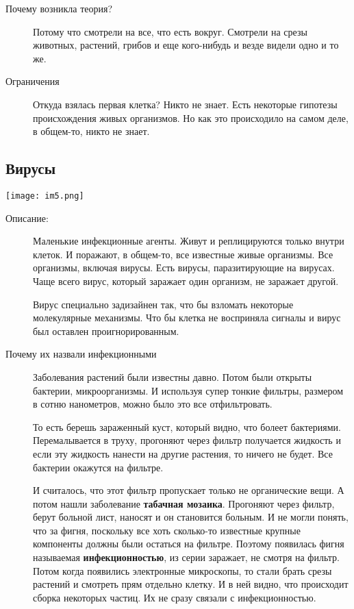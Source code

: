\begin{description}
    \item[Почему возникла теория?]
    Потому что смотрели на все, что есть вокруг. 
    Смотрели на срезы животных, растений, грибов и еще кого-нибудь и везде видели одно и то же. 

    \item[Ограничения] Откуда взялась первая клетка? Никто не знает. 
    Есть некоторые гипотезы происхождения живых организмов. 
    Но как это происходило на самом деле, в общем-то, никто не знает. 

\end{description}

\subsection{Вирусы}
\texttt{[image: im5.png]}

\begin{description}
\item[Описание:]
Маленькие инфекционные агенты. Живут и реплицируются только 
внутри клеток. И поражают, в общем-то, все известные живые 
организмы. Все организмы, включая вирусы. Есть вирусы, паразитирующие на вирусах.
Чаще всего вирус, который заражает один организм, не заражает другой. 

Вирус специально задизайнен так, что бы взломать некоторые молекулярные 
механизмы. Что бы клетка не восприняла сигналы и вирус был оставлен проигнорированным. 


\item[Почему их назвали инфекционными]
Заболевания растений были известны давно. 
Потом были открыты бактерии, микроорганизмы. И используя супер тонкие фильтры, 
размером в сотню нанометров, можно было это все отфильтровать. 

То есть берешь зараженный куст, который видно, что болеет бактериями. 
Перемалывается в труху, прогоняют через фильтр получается жидкость и если 
эту жидкость нанести на другие растения, то 
ничего не будет. Все бактерии окажутся на фильтре. 

И считалось, что этот фильтр пропускает только не органические вещи. А
потом нашли заболевание \textbf{табачная мозаика}. Прогоняют через фильтр, 
берут больной лист, наносят и он становится больным. И не могли понять, 
что за фигня, поскольку все хоть сколько-то известные крупные компоненты должны 
были остаться на фильтре. Поэтому появилась фигня называемая \textbf{инфекционностью}, 
из серии заражает, не смотря на фильтр. Потом когда появились 
электронные микроскопы, то стали брать срезы растений и 
смотреть прям отдельно клетку. И в ней видно, что 
происходит сборка некоторых частиц. Их не сразу связали с инфекционностью.
\end{description}

